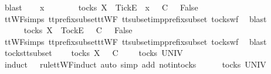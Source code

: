 \ blast\isanewline
{}\isamarkupfalse%
\isanewline
\ \ \isamarkupfalse%
\ x\ {\isasymrho}\ {\isasymsigma}\isanewline
\ \ \isamarkupfalse%
\ {\isachardoublequoteopen}{\isasymsigma}\ {\isasymin}\ tocks\ X\ {\isasymLongrightarrow}\ {\isacharbrackleft}Tick{\isacharbrackright}\isactrlsub E\ {\isacharhash}\ x\ {\isacharhash}\ {\isasymrho}\ {\isasymsubseteq}\isactrlsub C\ {\isasymsigma}\ {\isasymLongrightarrow}\ False{\isachardoublequoteclose}\isanewline
\ \ \ \ \isamarkupfalse%
\ ttWF{\isachardot}simps{\isacharparenleft}{}{\isacharparenright}\ tt{\isacharunderscore}prefix{\isacharunderscore}subset{\isacharunderscore}ttWF\ tt{\isacharunderscore}subset{\isacharunderscore}imp{\isacharunderscore}prefix{\isacharunderscore}subset\ tocks{\isacharunderscore}wf\ \isamarkupfalse%
\ blast\isanewline
{}\isamarkupfalse%
\isanewline
\ \ \isamarkupfalse%
\ {\isasymrho}\ {\isasymsigma}\isanewline
\ \ \isamarkupfalse%
\ {\isachardoublequoteopen}{\isasymsigma}\ {\isasymin}\ tocks\ X\ {\isasymLongrightarrow}\ {\isacharbrackleft}Tock{\isacharbrackright}\isactrlsub E\ {\isacharhash}\ {\isasymrho}\ {\isasymsubseteq}\isactrlsub C\ {\isasymsigma}\ {\isasymLongrightarrow}\ False{\isachardoublequoteclose}\isanewline
\ \ \ \ \isamarkupfalse%
\ ttWF{\isachardot}simps{\isacharparenleft}{}{\isacharparenright}\ tt{\isacharunderscore}prefix{\isacharunderscore}subset{\isacharunderscore}ttWF\ tt{\isacharunderscore}subset{\isacharunderscore}imp{\isacharunderscore}prefix{\isacharunderscore}subset\ tocks{\isacharunderscore}wf\ \isamarkupfalse%
\ blast\isanewline
{}\isamarkupfalse%
%
\endisatagproof
{\isafoldproof}%
%
\isadelimproof
\isanewline
%
\endisadelimproof
\isanewline
{}\isamarkupfalse%
\ tocks{\isacharunderscore}tt{\isacharunderscore}subset{}{\isacharcolon}\isanewline
\ \ {\isachardoublequoteopen}{\isasymrho}\ {\isasymin}\ tocks\ X\ {\isasymLongrightarrow}\ {\isasymrho}\ {\isasymsubseteq}\isactrlsub C\ {\isasymsigma}\ {\isasymLongrightarrow}\ {\isasymsigma}\ {\isasymin}\ tocks\ UNIV{\isachardoublequoteclose}\isanewline
%
\isadelimproof
%
\endisadelimproof
%
\isatagproof
{}\isamarkupfalse%
\ {\isacharparenleft}induct\ {\isasymrho}\ {\isasymsigma}\ rule{\isacharcolon}ttWF{}{\isachardot}induct{\isacharcomma}\ auto\ simp\ add{\isacharcolon}\ notin{\isacharunderscore}tocks{\isacharparenright}\isanewline
\ \ \isamarkupfalse%
\ {\isachardoublequoteopen}{\isacharbrackleft}{\isacharbrackright}\ {\isasymin}\ tocks\ UNIV{\isachardoublequoteclose}\isanewline
